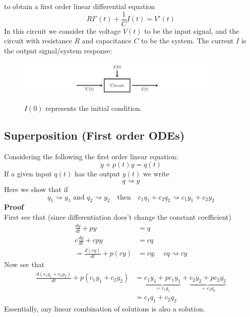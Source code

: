 \documentclass{report}
\begin{document}
to obtain a first order linear differential equation
\begin{equation*}
RI'(t)+\frac{1}{C}I(t)=V'(t)
\end{equation*}
In this circuit we consider the voltage $V(t)$ to be the input signal, and the circuit with resistance $R$ and
capacitance $C$ to be the system. The current $I$ is the output signal/system response:
\begin{figure}[h]
\begin{center}
\includegraphics[width=10cm]{7}\\
\end{center}
$I(0)$ represents the initial condition.
\end{figure}
\newpage

\subsection{Superposition (First order ODEs)}%
Considering the following the first order linear equation:
\begin{equation*}
\dot{y}+p(t)y=q(t)
\end{equation*}
If a given input $q(t)$ has the output $y(t)$ we write
\begin{equation*}
q\rightsquigarrow y
\end{equation*}
Here we show that if
\begin{equation*}
q_1\rightsquigarrow y_1\text{ and }q_2\rightsquigarrow y_2
\quad\text{then}\quad c_1q_1+c_2q_2\rightsquigarrow
c_1y_1+c_2y_2
\end{equation*}
\textbf{Proof}\\
First see that (since differentiation does't change the constant coefficient)
\begin{align*}
\frac{dy}{dt}+py&=q\\
c\frac{dy}{dt}+cpy&=cq\\
=\frac{d(cy)}{dt}+p(cy)&=cq;\quad cq\rightsquigarrow cy
\end{align*}
Now see that
\begin{align*}
\frac{d(c_1y_1+c_2y_2)}{dt}+p(c_1y_1+c_2y_2)
&=\underbrace{c_1\dot{y}_1+pc_1y_1}_{=c_1q_1}
+\underbrace{c_2\dot{y}_2+pc_2y_2}_{=c_2q_2}\\
&=c_1q_1+c_2q_2
\end{align*}
Essentially, any linear combination of solutions is also a solution.
\newpage
\end{document}
